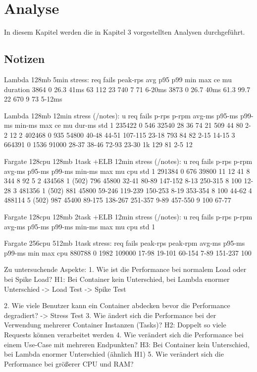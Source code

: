 \chapter{Analyse}
In diesem Kapitel werden die in Kapitel 3 vorgestellten Analysen durchgeführt.

\section{Notizen}

Lambda 128mb 5min stress:
req     fails   peak-rps    avg     p95     p99     min     max     ce  mu  duration 
3864    0       26.3        41ms    63      112     23      740     7   71  6-20ms
3873    0       26.7        40ms    61.3    99.7    22      670     9   73  5-12ms

Lambda 128mb 12min stress (/notes):
u   req     fails   p-rps   p-rpm   avg-ms  p95-ms  p99-ms  min-ms  max ce  mu  dur-ms  std
1   235422  0       546     32540   28      36      74      21      509 44  80  2-2     12
2   402468  0       935     54800   40-48   44-51   107-115 23-18   793 84  82  2-15    14-15
3   664391  0       1536    91000   28-37   38-46   72-93   23-30   1k  129 81  2-5     12

Fargate 128cpu 128mb 1task +ELB 12min stress (/notes):
u   req     fails   p-rps   p-rpm   avg-ms  p95-ms  p99-ms  min-ms  max     mu  cpu     std
1   291384  0       676     39800   11      12      41      8       344     8   92      5
2   434568  1 (502) 796     45800   32-41   80-89   147-152 8-13    250-315 8   100     12-28
3   481356  1 (502) 881     45800   59-246  119-239 150-253 8-19    353-354 8   100     44-62
4   488114  5 (502) 987     45400   89-175  138-267 251-357 9-89    457-550 9   100     67-77

Fargate 128cpu 128mb 2task +ELB 12min stress (/notes):
u   req     fails   p-rps   p-rpm   avg-ms  p95-ms  p99-ms  min-ms  max     mu  cpu     std
1      

Fargate 256cpu 512mb 1task stress:
req     fails   peak-rps    peak-rpm    avg-ms  p95-ms  p99-ms  min     max     cpu
880788  0       1982        109000      17-98   19-101  60-154  7-89    151-237 100

Zu untersuchende Aspekte:
1. Wie ist die Performance bei normalem Load oder bei Spike Load?
    H1: Bei Container kein Unterschied, bei Lambda enormer Unterschied
    -> Load Test
    -> Spike Test
    
2. Wie viele Benutzer kann ein Container abdecken bevor die Performance degradiert?
    -> Stress Test
3. Wie ändert sich die Performance bei der Verwendung mehrerer Container Instanzen (Tasks)?
    H2: Doppelt so viele Requests können verarbeitet werden
4. Wie verändert sich die Performance bei einem Use-Case mit mehreren Endpunkten?
    H3: Bei Container kein Unterschied, bei Lambda enormer Unterschied (ähnlich H1)
5. Wie verändert sich die Performance bei größerer CPU und RAM?



